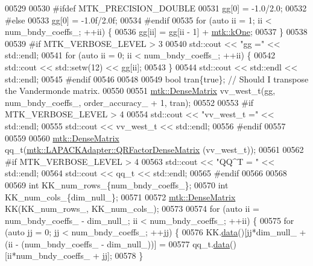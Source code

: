 \begin{DoxyCode}
{{00529 
00530 \textcolor{preprocessor}{  #ifdef MTK\_PRECISION\_DOUBLE}
00531   gg[0] = -1.0/2.0;
00532 \textcolor{preprocessor}{  #else}
00533   gg[0] = -1.0f/2.0f;
00534 \textcolor{preprocessor}{  #endif}
00535   \textcolor{keywordflow}{for} (\textcolor{keyword}{auto} ii = 1; ii < num\_bndy\_coeffs\_; ++ii) \{
00536     gg[ii] = gg[ii - 1] + \hyperlink{group__c01-roots_ga26407c24d43b6b95480943340d285c71}{mtk::kOne};
00537   \}
00538 
00539 \textcolor{preprocessor}{  #if MTK\_VERBOSE\_LEVEL > 3}
00540   std::cout << \textcolor{stringliteral}{"gg ="} << std::endl;
00541   \textcolor{keywordflow}{for} (\textcolor{keyword}{auto} ii = 0; ii < num\_bndy\_coeffs\_; ++ii) \{
00542     std::cout << std::setw(12) << gg[ii];
00543   \}
00544   std::cout << std::endl << std::endl;
00545 \textcolor{preprocessor}{  #endif}
00546 
00548 
00549   \textcolor{keywordtype}{bool} tran\{\textcolor{keyword}{true}\}; \textcolor{comment}{// Should I transpose the Vandermonde matrix.}
00550 
00551   \hyperlink{classmtk_1_1DenseMatrix}{mtk::DenseMatrix} vv\_west\_t(gg, num\_bndy\_coeffs\_, order\_accuracy\_ + 1, tran);
00552 
00553 \textcolor{preprocessor}{  #if MTK\_VERBOSE\_LEVEL > 4}
00554   std::cout << \textcolor{stringliteral}{"vv\_west\_t ="} << std::endl;
00555   std::cout << vv\_west\_t << std::endl;
00556 \textcolor{preprocessor}{  #endif}
00557 
00559 
00560   \hyperlink{classmtk_1_1DenseMatrix}{mtk::DenseMatrix} qq\_t(\hyperlink{classmtk_1_1LAPACKAdapter_ae5c6e78c9c819c9ac7a6f31bfd011d7a}{mtk::LAPACKAdapter::QRFactorDenseMatrix}
      (vv\_west\_t));
00561 
00562 \textcolor{preprocessor}{  #if MTK\_VERBOSE\_LEVEL > 4}
00563   std::cout << \textcolor{stringliteral}{"QQ^T = "} << std::endl;
00564   std::cout << qq\_t << std::endl;
00565 \textcolor{preprocessor}{  #endif}
00566 
00568 
00569   \textcolor{keywordtype}{int} KK\_num\_rows\_\{num\_bndy\_coeffs\_\};
00570   \textcolor{keywordtype}{int} KK\_num\_cols\_\{dim\_null\_\};
00571 
00572   \hyperlink{classmtk_1_1DenseMatrix}{mtk::DenseMatrix} KK(KK\_num\_rows\_, KK\_num\_cols\_);
00573 
00574   \textcolor{keywordflow}{for} (\textcolor{keyword}{auto} ii = num\_bndy\_coeffs\_ - dim\_null\_; ii < num\_bndy\_coeffs\_; ++ii) \{
00575     \textcolor{keywordflow}{for} (\textcolor{keyword}{auto} jj = 0; jj < num\_bndy\_coeffs\_; ++jj) \{
00576       KK.\hyperlink{classmtk_1_1DenseMatrix_a0c33b8a9e01d157c61ddbdf807c25d84}{data}()[jj*dim\_null\_ + (ii - (num\_bndy\_coeffs\_ - dim\_null\_))] =
00577           qq\_t.\hyperlink{classmtk_1_1DenseMatrix_a0c33b8a9e01d157c61ddbdf807c25d84}{data}()[ii*num\_bndy\_coeffs\_ + jj];
00578     \}
}}
\end{DoxyCode}

